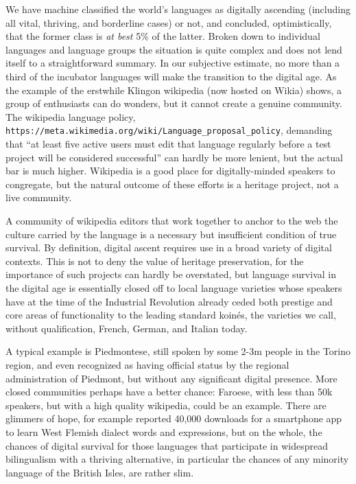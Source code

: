 \documentclass[10pt]{article}
\begin{document}
{\color{black} We have machine classified the world's languages as digitally
  ascending (including all vital, thriving, and borderline cases) or not, and
  concluded, optimistically, that the former class is {\it at best} 5\% of the
  latter. Broken down to individual languages and language groups t}he
situation is quite complex and does not lend itself to a straightforward
summary.  In our {\color{black} subjective} estimate, no more than a third of the
incubator languages will make the transition to the digital age. As the
example of the erstwhile Klingon wikipedia (now hosted on Wikia) shows, a
group of enthusiasts can do wonders, but it cannot create a genuine
community. The wikipedia language policy, {\tt
  https://meta.wikimedia.org/wiki/Language\_proposal\_policy}, demanding that
``at least five active users must edit that language regularly before a test
project will be considered successful'' can hardly be more lenient, but the
actual bar is much higher. Wikipedia is a good place for digitally-minded
speakers to congregate, but the natural outcome of these efforts is a heritage
project, not a live community.

A community of wikipedia editors that work together to anchor to the web the
culture carried by the language is a necessary but insufficient condition of
true survival. By definition, digital ascent requires use in a broad
variety of digital contexts. This is not to deny the value of heritage
preservation, for the importance of such projects can hardly be overstated,
but language survival in the digital age is essentially closed off to local
language varieties whose speakers have at the time of the Industrial
Revolution already ceded both prestige and core areas of functionality to the
leading standard koin\'es, the varieties we call, without qualification,
French, German, and Italian today. 

A typical example is Piedmontese, still spoken by some 2-3m people in the
Torino region, and even recognized as having official status by the regional
administration of Piedmont, but without any significant digital presence.
More closed communities perhaps have a better chance: Faroese, with less than
50k speakers, but with a high quality wikipedia, could be an example.  There
are glimmers of hope, for example \cite{flanderstoday:12-06-12} reported
40,000 downloads for a smartphone app to learn West Flemish dialect words and
expressions, but on the whole, the chances of digital survival for those
languages that participate in widespread bilingualism with a thriving
alternative, in particular the chances of any minority language of the British
Isles, are rather slim. 
\end{document}
